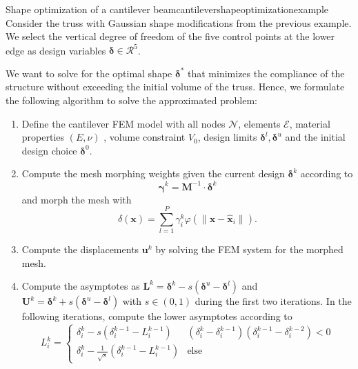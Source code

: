 \begin{example}{Shape optimization of a cantilever beam}{cantilevershapeoptimizationexample}
    Consider the truss with Gaussian shape modifications from the previous example. We select the vertical degree of freedom of the five control points at the lower edge as design variables $\pmb{\delta} \in \mathcal{R}^5$.

    We want to solve for the optimal shape $\pmb{\delta}^*$ that minimizes the compliance of the structure without exceeding the initial volume of the truss. Hence, we formulate the following algorithm to solve the approximated problem: 
    \begin{enumerate}
        \item Define the cantilever FEM model with all nodes $\mathcal{N}$, elements $\mathcal{E}$, material properties $(E, \nu)$ , volume constraint $V_0$, design limits $\pmb{\delta}^l, \pmb{\delta}^u$ and the initial design choice $\pmb{\delta}^0$.
        \item Compute the mesh morphing weights given the current design $\pmb{\delta}^k$ according to
        \begin{equation}
             \pmb{\gamma}^k = \mathbf{M}^{-1} \cdot \pmb{\delta}^k 
        \end{equation}
        and morph the mesh with 
        \begin{equation}
            \delta(\mathbf{x}) = \sum_{l=1}^P \gamma_i^k \varphi(\lVert \mathbf{x}-\hat{\mathbf{x}}_i \rVert).
        \end{equation}
        \item Compute the displacements $\mathbf{u}^k$ by solving the FEM system for the morphed mesh.
        \item Compute the asymptotes as $\mathbf{L}^k = \pmb{\delta}^k - s (\pmb{\delta}^u - \pmb{\delta}^l)$ and $\mathbf{U}^k =\pmb{\delta}^k + s (\pmb{\delta}^u - \pmb{\delta}^l)$ with $s \in (0,1)$ during the first two iterations. In the following iterations, compute the lower asymptotes according to 
        \begin{equation}
            L^k_i = 
            \begin{cases}
                \delta^k_i - s  (\delta^{k-1}_i-L^{k-1}_i) & (\delta_i^k-\delta_i^{k-1})(\delta_i^{k-1}-\delta_i^{k-2}) < 0\\
                \delta^k_i - \frac{1}{\sqrt{s}}  (\delta^{k-1}_i-L^{k-1}_i) & \text{else}
            \end{cases}
        \end{equation}

\end{enumerate}
\end{example}
